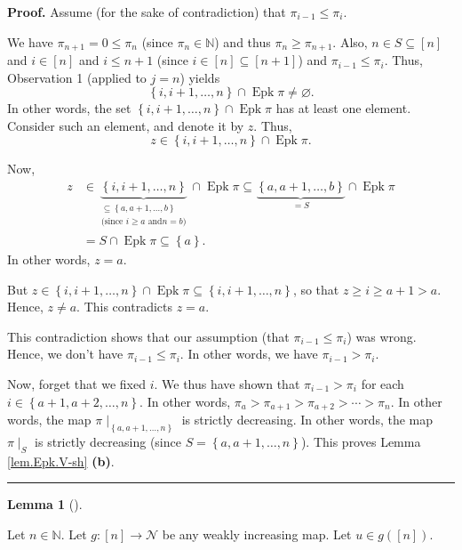 \documentclass[numbers=enddot,12pt,final,onecolumn,notitlepage]{scrartcl}%
\theoremstyle{definition}
\newtheorem{lem}[theo]{Lemma}
\newenvironment{lemma}[1][]
{\begin{lem}[#1]\begin{leftbar}}
{\end{leftbar}\end{lem}}
\newenvironment{proof}[1][Proof]{\noindent\textbf{#1.} }{\ \rule{0.5em}{0.5em}}
\newenvironment{verlong}{}{}
\begin{document}
\begin{verlong}
\begin{proof}
Assume (for the sake of contradiction) that $\pi_{i-1}\leq\pi_{i}$.

We have $\pi_{n+1}=0\leq\pi_{n}$ (since $\pi_{n}\in\mathbb{N}$) and thus
$\pi_{n}\geq\pi_{n+1}$. Also, $n\in S\subseteq\left[  n\right]  $ and
$i\in\left[  n\right]  $ and $i\leq n+1$ (since $i\in\left[  n\right]
\subseteq\left[  n+1\right]  $) and $\pi_{i-1}\leq\pi_{i}$. Thus, Observation
1 (applied to $j=n$) yields
\[
\left\{  i,i+1,\ldots,n\right\}  \cap\operatorname{Epk}\pi\neq\varnothing.
\]
In other words, the set $\left\{  i,i+1,\ldots,n\right\}  \cap
\operatorname{Epk}\pi$ has at least one element. Consider such an element,
and denote it by $z$. Thus,%
\[
z\in\left\{  i,i+1,\ldots,n\right\}  \cap\operatorname{Epk}\pi.
\]


Now,%
\begin{align*}
z  &  \in\underbrace{\left\{  i,i+1,\ldots,n\right\}  }_{\substack{\subseteq
\left\{  a,a+1,\ldots,b\right\}  \\\text{(since }i\geq a\text{ and
}n=b\text{)}}}\cap\operatorname{Epk}\pi
\subseteq
\underbrace{\left\{  a,a+1,\ldots
,b\right\}  }_{=S}\cap\operatorname{Epk}\pi\\
&  =S\cap\operatorname{Epk}\pi
\subseteq \left\{  a\right\}  .
\end{align*}
In other words, $z=a$.

But $z\in\left\{  i,i+1,\ldots,n\right\}  \cap\operatorname{Epk}\pi
\subseteq\left\{  i,i+1,\ldots,n\right\}  $, so that $z\geq i\geq a+1>a$.
Hence, $z\neq a$. This contradicts $z=a$.

This contradiction shows that our assumption (that $\pi_{i-1}\leq\pi_{i}$) was
wrong. Hence, we don't have $\pi_{i-1}\leq\pi_{i}$. In other words, we have
$\pi_{i-1}>\pi_{i}$.

Now, forget that we fixed $i$. We thus have shown that $\pi_{i-1}>\pi_{i}$ for
each $i\in\left\{  a+1,a+2,\ldots,n\right\}  $. In other words, $\pi_{a}%
>\pi_{a+1}>\pi_{a+2}>\cdots>\pi_{n}$. In other words, the map $\pi
\mid_{\left\{  a,a+1,\ldots,n\right\}  }$ is strictly decreasing. In other
words, the map $\pi\mid_{S}$ is strictly decreasing (since $S=\left\{
a,a+1,\ldots,n\right\}  $). This proves Lemma \ref{lem.Epk.V-sh} \textbf{(b)}.
\end{proof}

\begin{lemma}
\label{lem.fiberends.cut}Let $n\in\mathbb{N}$. Let $g:\left[  n\right]
\rightarrow\mathcal{N}$ be any weakly increasing map. Let $u\in g\left(
\left[  n\right]  \right)  $.


\end{lemma}
\end{verlong}
\end{document}
